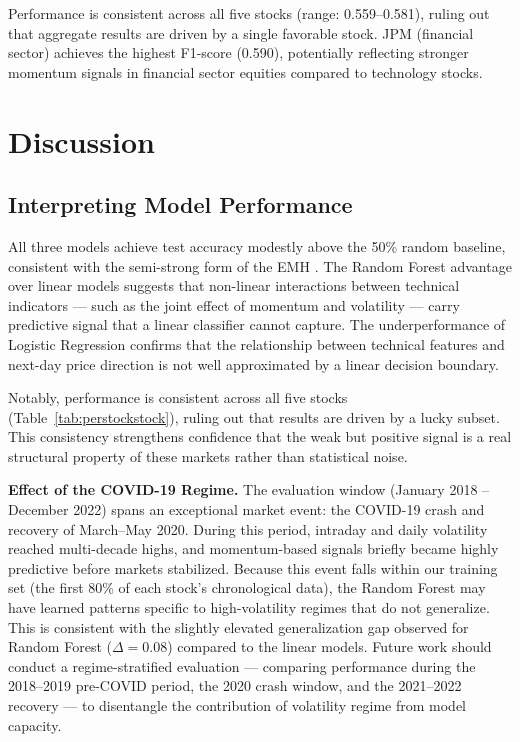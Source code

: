 \documentclass{article}
\begin{document}
Performance is consistent across all five stocks (range: 0.559--0.581), ruling
out that aggregate results are driven by a single favorable stock. JPM
(financial sector) achieves the highest F1-score (0.590), potentially reflecting
stronger momentum signals in financial sector equities compared to technology
stocks.

\section{Discussion}

\subsection{Interpreting Model Performance}

All three models achieve test accuracy modestly above the 50\% random baseline,
consistent with the semi-strong form of the EMH \citep{fama1970}. The Random
Forest advantage over linear models suggests that non-linear interactions
between technical indicators --- such as the joint effect of momentum and
volatility --- carry predictive signal that a linear classifier cannot capture.
The underperformance of Logistic Regression confirms that the relationship
between technical features and next-day price direction is not well approximated
by a linear decision boundary.

Notably, performance is consistent across all five stocks (Table~\ref{tab:perstockstock}),
ruling out that results are driven by a lucky subset. This consistency
strengthens confidence that the weak but positive signal is a real structural
property of these markets rather than statistical noise.

\textbf{Effect of the COVID-19 Regime.} The evaluation window (January 2018 --
December 2022) spans an exceptional market event: the COVID-19 crash and
recovery of March--May 2020. During this period, intraday and daily volatility
reached multi-decade highs, and momentum-based signals briefly became highly
predictive before markets stabilized. Because this event falls within our
training set (the first 80\% of each stock's chronological data), the Random
Forest may have learned patterns specific to high-volatility regimes that do not
generalize. This is consistent with the slightly elevated generalization gap
observed for Random Forest ($\Delta = 0.08$) compared to the linear models.
Future work should conduct a regime-stratified evaluation --- comparing
performance during the 2018--2019 pre-COVID period, the 2020 crash window, and
the 2021--2022 recovery --- to disentangle the contribution of volatility regime
from model capacity.
\end{document}
